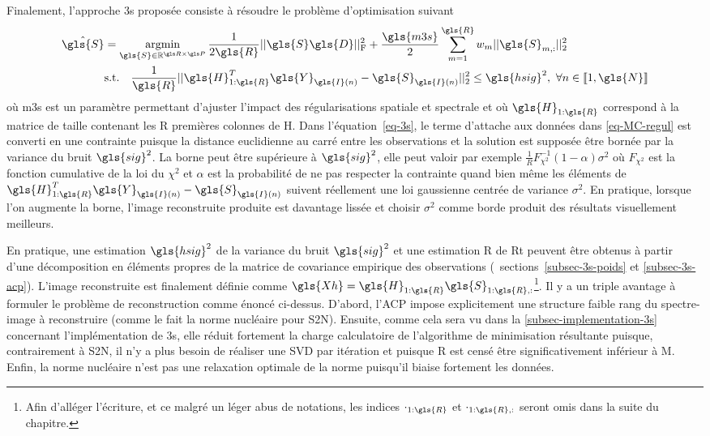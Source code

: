 Finalement, l'approche \gls{3s} proposée consiste à résoudre le problème d'optimisation suivant
\begin{align}
\hat{\gls{S}} &= \argmin_{\gls{S}\in\mathbb{R}^{\taille{R}{P}}}
    \frac{1}{2\gls{R}}\frobnorm{\gls{S} \gls{D}} + 
    \frac{\gls{m3s}}{2}\sum_{m=1}^{\gls{R}} w_{m} \twonorm{\gls{S}_{m,:}} \nonumber \\
%
&\textrm{s.t.}\quad         
    \frac{1}{\gls{R}}\twonorm{\gls{H}_{1:\gls{R}}^T\gls{Y}_{\gls{I}(n)}-\gls{S}_{\gls{I}(n)}}
    \leq\gls{hsig}^2,\ \forall n\in\llbracket 1, \gls{N} \rrbracket \label{eq-3s}
\end{align}
où \gls{m3s} est un paramètre permettant d'ajuster l'impact des régularisations spatiale et spectrale et où $\gls{H}_{1:\gls{R}}$ correspond à la matrice de taille  contenant les \gls{R} premières colonnes de \gls{H}. Dans l'équation~\eqref{eq-3s}, le terme d'attache aux données dans \eqref{eq-MC-regul} est converti en une contrainte puisque la distance euclidienne au carré entre les observations et la solution est supposée être bornée par la variance du bruit $\gls{sig}^2$.
%
La borne peut être supérieure à $\gls{sig}^2$, elle peut valoir par exemple $\frac{1}{R}F_{\chi^2}^{-1}(1-\alpha)\sigma^2$ où $F_{\chi^2}$ est la fonction cumulative de la loi du $\chi^2$ et $\alpha$ est la probabilité de ne pas respecter la contrainte quand bien même les éléments de $\gls{H}_{1:\gls{R}}^T\gls{Y}_{\gls{I}(n)}-\gls{S}_{\gls{I}(n)}$ suivent réellement une loi gaussienne centrée de variance $\sigma^2$. En pratique, lorsque l'on augmente la borne, l'image reconstruite produite est davantage lissée et  choisir $\sigma^2$ comme borde produit des résultats visuellement meilleurs.
%

En pratique, une estimation $\gls{hsig}^2$ de la variance du bruit  $\gls{sig}^2$ et une estimation \gls{R} de \gls{Rt} peuvent être obtenus à partir d'une décomposition en éléments propres de la matrice de covariance empirique des observations (\cf\ sections~\ref{subsec-3s-poids} et \ref{subsec-3s-acp}). L'image reconstruite est finalement définie comme $\gls{Xh} = \gls{H}_{1:\gls{R}}\gls{S}_{1:\gls{R}, :}$\footnote{Afin d'alléger l'écriture, et ce malgré un léger abus de notations, les indices $\cdot_{1:\gls{R}}$ et $\cdot_{1:\gls{R}, :}$ seront omis dans la suite du chapitre.}.
Il y a un triple avantage à formuler le problème de reconstruction comme énoncé ci-dessus. 
%
D'abord, l'ACP impose explicitement une structure faible rang du spectre-image à reconstruire (comme le fait la norme nucléaire pour S2N). Ensuite, comme cela sera vu dans la \cref{subsec-implementation-3s} concernant l'implémentation de \gls{3s}, elle réduit fortement la charge calculatoire de l'algorithme de minimisation résultante puisque, contrairement à S2N, il n'y a plus besoin de réaliser une SVD par itération et puisque \gls{R} est censé être significativement inférieur à \gls{M}. Enfin, la norme nucléaire n'est pas une relaxation optimale de la norme puisqu'il biaise fortement les données.


